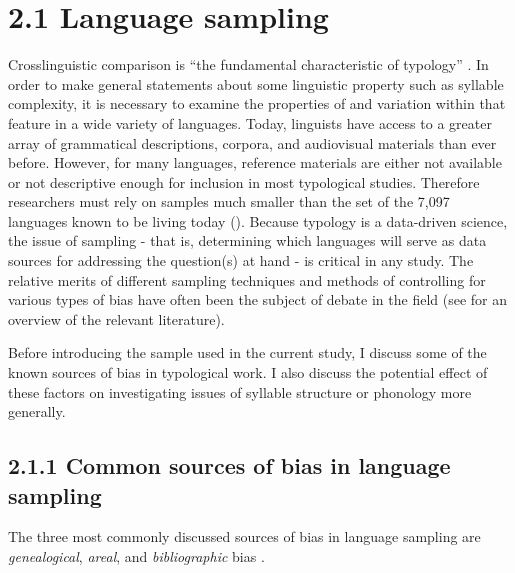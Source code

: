 \section{2.1 Language sampling}

  Crosslinguistic comparison is “the fundamental characteristic of typology” \citep[6]{Croft2003}. In order to make general statements about some linguistic property such as syllable complexity, it is necessary to examine the properties of and variation within that feature in a wide variety of languages. Today, linguists have access to a greater array of grammatical descriptions, corpora, and audiovisual materials than ever before. However, for many languages, reference materials are either not available or not descriptive enough for inclusion in most typological studies. Therefore researchers must rely on samples much smaller than the set of the 7,097 languages known to be living today (\citealt{SimonsFennig2018}). Because typology is a data-driven science, the issue of sampling - that is, determining which languages will serve as data sources for addressing the question(s) at hand - is critical in any study. The relative merits of different sampling techniques and methods of controlling for various types of bias have often been the subject of debate in the field (see \citealt{Bakker2011} for an overview of the relevant literature). 



  Before introducing the sample used in the current study, I discuss some of the known sources of bias in typological work. I also discuss the potential effect of these factors on investigating issues of syllable structure or phonology more generally.


\subsection{2.1.1 Common sources of bias in language sampling}

  The three most commonly discussed sources of bias in language sampling are \textit{genealogical}, \textit{areal}, and \textit{bibliographic} bias \citep{Bakker2011}. 



